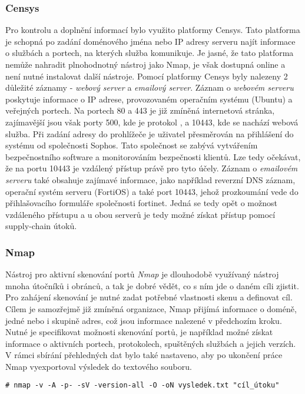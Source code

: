 \subsubsection{Censys}
Pro kontrolu a doplnění informací bylo využito platformy Censys.
Tato platforma je schopná po zadání doménového jména nebo IP adresy serveru najít informace o službách a portech, na kterých služba komunikuje.
Je jasné, že tato platforma nemůže nahradit plnohodnotný nástroj jako Nmap, je však dostupná online a není nutné instalovat další nástroje.
Pomocí platformy Censys byly nalezeny 2 důležité záznamy - \textit{webový server} a \textit{emailový server}.
Záznam o \textit{webovém serveru} poskytuje informace o IP adrese, provozovaném operačním systému (Ubuntu) a veřejných portech.
Na portech 80 a 443 je již zmíněná internetová stránka, zajímavější jsou však porty 500, kde je protokol , a 10443, kde se nachází webová služba.
Při zadání adresy do prohlížeče je uživatel přesměrován na přihlášení do systému od společnosti Sophos.
Tato společnost se zabývá vytvářením bezpečnostního software a monitorováním bezpečnosti klientů.
Lze tedy očekávat, že na portu 10443 je vzdálený přístup právě pro tyto účely.
Záznam o \textit{emailovém serveru} také obsahuje zajímavé informace, jako například reverzní \ac{DNS} záznam, operační systém serveru (FortiOS) a také port 10443, jehož prozkoumání vede do přihlašovacího formuláře společnosti fortinet.
Jedná se tedy opět o možnost vzdáleného přístupu a u obou serverů je tedy možné získat přístup pomocí supply-chain útoků.

\subsubsection{Nmap}
Nástroj pro aktivní skenování portů \textit{Nmap} je dlouhodobě využívaný nástroj mnoha útočníků i obránců, a tak je dobré vědět, co s ním jde o daném cíli zjistit.
Pro zahájení skenování je nutné zadat potřebné vlastnosti skenu a definovat cíl.
Cílem je samozřejmě již zmíněná organizace, Nmap přijímá informace o doméně, jedné nebo i skupině adres, což jsou informace nalezené v předchozím kroku.
Nutné je specifikovat možnosti skenování portů, je například možné získat informace o aktivních portech, protokolech, spuštěných službách a jejich verzích.
V rámci sbírání přehledných dat bylo také nastaveno, aby po ukončení práce Nmap vyexportoval výsledek do textového souboru.

\begin{codeblock}
	\begin{verbatim}
# nmap -v -A -p- -sV -version-all -O -oN vysledek.txt "cíl_útoku"
	\end{verbatim}
\end{codeblock}

